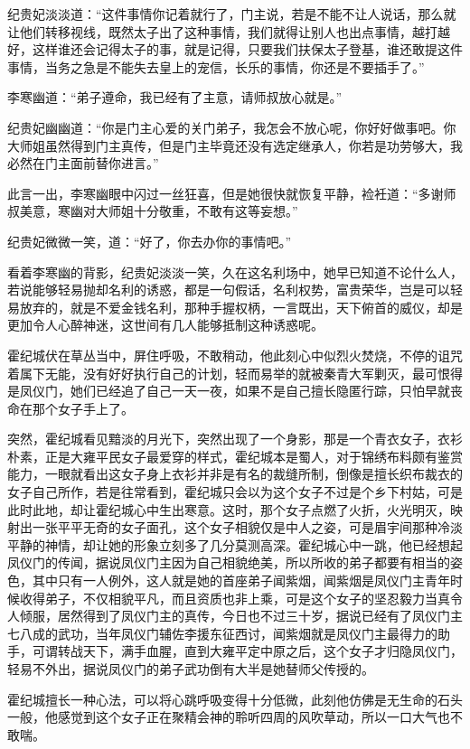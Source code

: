 纪贵妃淡淡道：“这件事情你记着就行了，门主说，若是不能不让人说话，那么就让他们转移视线，既然太子出了这种事情，我们就得让别人也出点事情，越打越好，这样谁还会记得太子的事，就是记得，只要我们扶保太子登基，谁还敢提这件事情，当务之急是不能失去皇上的宠信，长乐的事情，你还是不要插手了。”

李寒幽道：“弟子遵命，我已经有了主意，请师叔放心就是。”

纪贵妃幽幽道：“你是门主心爱的关门弟子，我怎会不放心呢，你好好做事吧。你大师姐虽然得到门主真传，但是门主毕竟还没有选定继承人，你若是功劳够大，我必然在门主面前替你进言。”

此言一出，李寒幽眼中闪过一丝狂喜，但是她很快就恢复平静，裣衽道：“多谢师叔美意，寒幽对大师姐十分敬重，不敢有这等妄想。”

纪贵妃微微一笑，道：“好了，你去办你的事情吧。”

看着李寒幽的背影，纪贵妃淡淡一笑，久在这名利场中，她早已知道不论什么人，若说能够轻易抛却名利的诱惑，都是一句假话，名利权势，富贵荣华，岂是可以轻易放弃的，就是不爱金钱名利，那种手握权柄，一言既出，天下俯首的威仪，却是更加令人心醉神迷，这世间有几人能够抵制这种诱惑呢。

霍纪城伏在草丛当中，屏住呼吸，不敢稍动，他此刻心中似烈火焚烧，不停的诅咒着属下无能，没有好好执行自己的计划，轻而易举的就被秦青大军剿灭，最可恨得是凤仪门，她们已经追了自己一天一夜，如果不是自己擅长隐匿行踪，只怕早就丧命在那个女子手上了。

突然，霍纪城看见黯淡的月光下，突然出现了一个身影，那是一个青衣女子，衣衫朴素，正是大雍平民女子最爱穿的样式，霍纪城本是蜀人，对于锦绣布料颇有鉴赏能力，一眼就看出这女子身上衣衫并非是有名的裁缝所制，倒像是擅长织布裁衣的女子自己所作，若是往常看到，霍纪城只会以为这个女子不过是个乡下村姑，可是此时此地，却让霍纪城心中生出寒意。这时，那个女子点燃了火折，火光明灭，映射出一张平平无奇的女子面孔，这个女子相貌仅是中人之姿，可是眉宇间那种冷淡平静的神情，却让她的形象立刻多了几分莫测高深。霍纪城心中一跳，他已经想起凤仪门的传闻，据说凤仪门主因为自己相貌绝美，所以所收的弟子都要有相当的姿色，其中只有一人例外，这人就是她的首座弟子闻紫烟，闻紫烟是凤仪门主青年时候收得弟子，不仅相貌平凡，而且资质也非上乘，可是这个女子的坚忍毅力当真令人倾服，居然得到了凤仪门主的真传，今日也不过三十岁，据说已经有了凤仪门主七八成的武功，当年凤仪门辅佐李援东征西讨，闻紫烟就是凤仪门主最得力的助手，可谓转战天下，满手血腥，直到大雍平定中原之后，这个女子才归隐凤仪门，轻易不外出，据说凤仪门的弟子武功倒有大半是她替师父传授的。

霍纪城擅长一种心法，可以将心跳呼吸变得十分低微，此刻他仿佛是无生命的石头一般，他感觉到这个女子正在聚精会神的聆听四周的风吹草动，所以一口大气也不敢喘。

